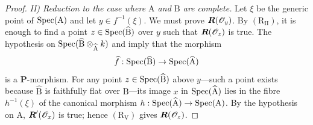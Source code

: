\begin{proof}
\emph{II) Reduction to the case where $\mathrm{A}$ and $\mathrm{B}$ are complete.} Let $\xi$ be the generic point of $\operatorname{Spec}(\mathrm{A})$ and let $y\in f^{-1}(\xi)$. We must prove $\boldsymbol{R}(\mathscr{O}_y)$. By $(\mathrm{R}_{\mathrm{II}})$, it is enough to find a point $z\in\operatorname{Spec}(\widehat{\mathrm{B}})$ over $y$ such that $\boldsymbol{R}(\mathscr{O}_z)$ is true. The hypothesis on $\operatorname{Spec}(\widehat{\mathrm{B}}\otimes_{\widehat{\mathrm{A}}}k)$ and  imply that the morphism
\[
  \widehat{f}:\operatorname{Spec}(\widehat{\mathrm{B}})\to\operatorname{Spec}(\widehat{\mathrm{A}})
\]
is a $\boldsymbol{P}$-morphism. For any point $z\in\operatorname{Spec}(\widehat{\mathrm{B}})$ above $y$---such a point exists because $\widehat{\mathrm{B}}$ is faithfully flat over $\mathrm{B}$---its image $x$ in $\operatorname{Spec}(\widehat{\mathrm{A}})$ lies in the fibre $h^{-1}(\xi)$ of the canonical morphism $h:\operatorname{Spec}(\widehat{\mathrm{A}})\to\operatorname{Spec}(\mathrm{A})$. By the hypothesis on $\mathrm{A}$, $\boldsymbol{R}'(\mathscr{O}_x)$ is true; hence $(\mathrm{R}_{\mathrm{V}})$ gives $\boldsymbol{R}(\mathscr{O}_z)$.
\end{proof}

